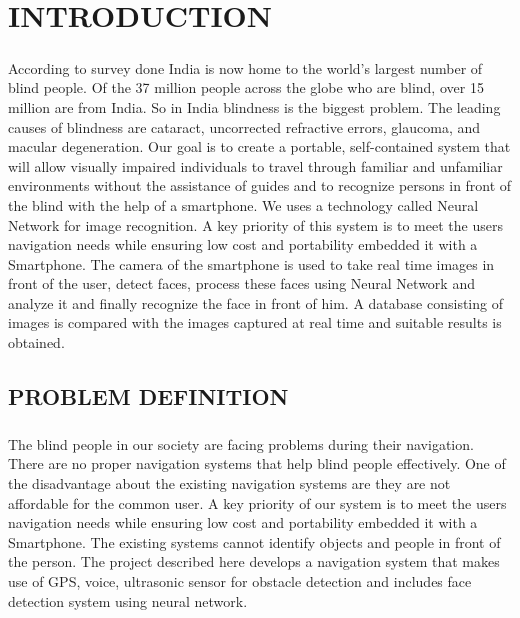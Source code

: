 \documentclass[10pt,a4paper,twoside]{report}
\begin{document}
\chapter{INTRODUCTION}

\pagestyle{fancy}
\rhead{\thepage}
\chead{}

\cfoot{}
\rfoot{}
\renewcommand{\headrulewidth}{0.4pt}
\renewcommand{\footrulewidth}{0.4pt}

\paragraph{ }According to survey done India is now home to the world’s largest number of blind people. Of the 37 million people across the globe who are blind, over 15 million are from India. So in India blindness is the biggest problem. The leading causes of blindness are cataract, uncorrected refractive errors, glaucoma, and macular degeneration. Our goal is to create a portable, self-contained system that will allow visually impaired individuals to travel through familiar and unfamiliar environments without the assistance of guides and to recognize persons in front of the blind with the help of a smartphone. We uses a technology called Neural Network for image recognition. A key priority of this system is to meet the users navigation needs while ensuring low cost and portability embedded it with a Smartphone. The camera of the smartphone  is used to take real time images in front of the user, detect faces, process these faces using Neural Network and analyze it and finally recognize the face in front of him. A database consisting of images  is compared with the images captured at real time and suitable results is obtained.
\section{PROBLEM DEFINITION}
\paragraph{ } The blind people in our society are facing problems during their navigation. There are no proper navigation systems that help blind people effectively. One of the disadvantage about the existing navigation systems are they are not affordable for the common user. A key priority of our system is to meet the users navigation needs while ensuring low cost and portability embedded it with a Smartphone.  The existing systems cannot identify objects and people in front of the person. The project described here develops a navigation system that makes use of GPS, voice, ultrasonic sensor for obstacle detection and includes face detection system using neural network.
\newpage
\end{document}
